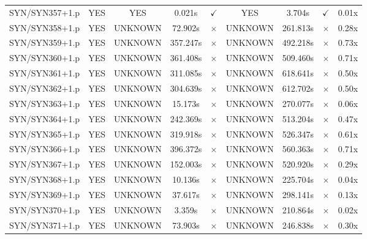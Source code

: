 \documentclass[a4paper,10pt]{article}
\begin{document}
\begin{longtable}{lcccccccc}
SYN/SYN357+1.p & YES & YES & 0.021s & \cellcolor{matchcolor}$\checkmark$ & YES & 3.704s & \cellcolor{matchcolor}$\checkmark$ & 0.01x \\
SYN/SYN358+1.p & YES & UNKNOWN & 72.902s & \cellcolor{mismatchcolor}$\times$ & UNKNOWN & 261.813s & \cellcolor{mismatchcolor}$\times$ & 0.28x \\
SYN/SYN359+1.p & YES & UNKNOWN & 357.247s & \cellcolor{mismatchcolor}$\times$ & UNKNOWN & 492.218s & \cellcolor{mismatchcolor}$\times$ & 0.73x \\
SYN/SYN360+1.p & YES & UNKNOWN & 361.408s & \cellcolor{mismatchcolor}$\times$ & UNKNOWN & 509.460s & \cellcolor{mismatchcolor}$\times$ & 0.71x \\
SYN/SYN361+1.p & YES & UNKNOWN & 311.085s & \cellcolor{mismatchcolor}$\times$ & UNKNOWN & 618.641s & \cellcolor{mismatchcolor}$\times$ & 0.50x \\
SYN/SYN362+1.p & YES & UNKNOWN & 304.639s & \cellcolor{mismatchcolor}$\times$ & UNKNOWN & 612.702s & \cellcolor{mismatchcolor}$\times$ & 0.50x \\
SYN/SYN363+1.p & YES & UNKNOWN & 15.173s & \cellcolor{mismatchcolor}$\times$ & UNKNOWN & 270.077s & \cellcolor{mismatchcolor}$\times$ & 0.06x \\
SYN/SYN364+1.p & YES & UNKNOWN & 242.369s & \cellcolor{mismatchcolor}$\times$ & UNKNOWN & 513.204s & \cellcolor{mismatchcolor}$\times$ & 0.47x \\
SYN/SYN365+1.p & YES & UNKNOWN & 319.918s & \cellcolor{mismatchcolor}$\times$ & UNKNOWN & 526.347s & \cellcolor{mismatchcolor}$\times$ & 0.61x \\
SYN/SYN366+1.p & YES & UNKNOWN & 396.372s & \cellcolor{mismatchcolor}$\times$ & UNKNOWN & 560.363s & \cellcolor{mismatchcolor}$\times$ & 0.71x \\
SYN/SYN367+1.p & YES & UNKNOWN & 152.003s & \cellcolor{mismatchcolor}$\times$ & UNKNOWN & 520.920s & \cellcolor{mismatchcolor}$\times$ & 0.29x \\
SYN/SYN368+1.p & YES & UNKNOWN & 10.136s & \cellcolor{mismatchcolor}$\times$ & UNKNOWN & 225.704s & \cellcolor{mismatchcolor}$\times$ & 0.04x \\
SYN/SYN369+1.p & YES & UNKNOWN & 37.617s & \cellcolor{mismatchcolor}$\times$ & UNKNOWN & 298.141s & \cellcolor{mismatchcolor}$\times$ & 0.13x \\
SYN/SYN370+1.p & YES & UNKNOWN & 3.359s & \cellcolor{mismatchcolor}$\times$ & UNKNOWN & 210.864s & \cellcolor{mismatchcolor}$\times$ & 0.02x \\
SYN/SYN371+1.p & YES & UNKNOWN & 73.903s & \cellcolor{mismatchcolor}$\times$ & UNKNOWN & 246.838s & \cellcolor{mismatchcolor}$\times$ & 0.30x \\

\end{longtable}
\end{document}
